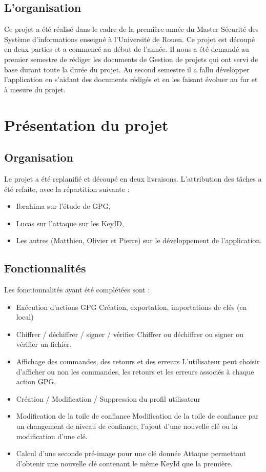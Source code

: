 \documentclass{../res/univ-projet}
\begin{document}
  \subsection{L'organisation}
    Ce projet a été réalisé dans le cadre de la première année du Master Sécurité des Système d'informations enseigné à  l'Université de Rouen. Ce projet est découpé en deux parties et a commencé au début de l'année. Il nous a été demandé au premier semestre de rédiger les documents de Gestion de projets qui ont servi de base durant toute la durée du projet. Au second semestre il a fallu développer l'application en s'aidant des documents rédigés et en les faisant évoluer au fur et à mesure du projet.

\section{Présentation du projet}
    \subsection{Organisation}
    
    Le projet a été replanifié et découpé en deux livraisons.
    L'attribution des tâches a été refaite, avec la répartition suivante :
    \begin{itemize}
      \item Ibrahima sur l'étude de GPG,
      \item Lucas sur l'attaque sur les KeyID,
      \item Les autres (Matthieu, Olivier et Pierre) sur le développement de l'application.
    \end{itemize}

  \subsection{Fonctionnalités}
    Les fonctionnalités ayant été complétées sont :\medbreak
  \begin{itemize}
  \item Exécution d'actions GPG \smallbreak
  Création, exportation, importations de clés (en local)\smallbreak
  \item Chiffrer / déchiffrer / signer / vérifier \smallbreak
  Chiffrer ou déchiffrer ou signer ou vérifier un fichier. \smallbreak
  \item Affichage des commandes, des retours et des erreurs \smallbreak
  L'utilisateur peut choisir d'afficher ou non les commandes, les retours et les erreurs associés à chaque action GPG. \smallbreak 
  \item Création / Modification / Suppression du profil utilisateur \smallbreak
  \item Modification de la toile de confiance \smallbreak
  Modification de la toile de confiance par un changement de niveau de confiance, l'ajout d'une nouvelle clé ou la modification d'une clé. \smallbreak
  \item Calcul d'une seconde pré-image pour une clé donnée \smallbreak
  Attaque permettant d'obtenir une nouvelle clé contenant le même KeyId que la première.
  \end{itemize}
\end{document}

